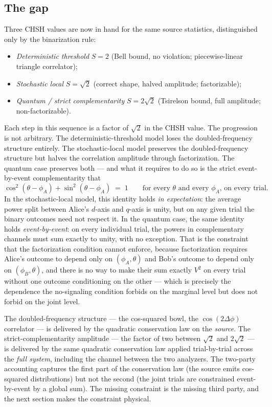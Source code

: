 \documentclass[
  11pt]{article}
\providecommand{\tightlist}{%
  \setlength{\itemsep}{0pt}\setlength{\parskip}{0pt}}
\begin{document}
\subsection{The gap}\label{the-gap}

Three CHSH values are now in hand for the same source statistics,
distinguished only by the binarization rule:

\begin{itemize}
\tightlist
\item
  \emph{Deterministic threshold} \(S = 2\) (Bell bound, no violation;
  piecewise-linear triangle correlator);
\item
  \emph{Stochastic local} \(S = \sqrt{2}\) (correct shape, halved
  amplitude; factorizable);
\item
  \emph{Quantum / strict complementarity} \(S = 2\sqrt{2}\) (Tsirelson
  bound, full amplitude; non-factorizable).
\end{itemize}

Each step in this sequence is a factor of \(\sqrt{2}\) in the CHSH
value. The progression is not arbitrary. The deterministic-threshold
model loses the doubled-frequency structure entirely. The
stochastic-local model preserves the doubled-frequency structure but
halves the correlation amplitude through factorization. The quantum case
preserves both --- and what it requires to do so is the strict
event-by-event complementarity that \[
\cos^2(\theta - \phi_A) + \sin^2(\theta - \phi_A) \;=\; 1 \qquad \text{for every $\theta$ and every $\phi_A$, on every trial.}
\] In the stochastic-local model, this identity holds \emph{in
expectation}: the average power split between Alice's \(d\)-axis and
\(q\)-axis is unity, but on any given trial the binary outcomes need not
respect it. In the quantum case, the same identity holds
\emph{event-by-event}: on every individual trial, the powers in
complementary channels must sum exactly to unity, with no exception.
That is the constraint that the factorization condition cannot enforce,
because factorization requires Alice's outcome to depend only on
\((\phi_A, \theta)\) and Bob's outcome to depend only on
\((\phi_B, \theta)\), and there is no way to make their sum exactly
\(V^2\) on every trial without one outcome conditioning on the other ---
which is precisely the dependence the no-signaling condition forbids on
the marginal level but does not forbid on the joint level.

The doubled-frequency structure --- the cos-squared bowl, the
\(\cos(2\Delta\phi)\) correlator --- is delivered by the quadratic
conservation law on the \emph{source}. The strict-complementarity
amplitude --- the factor of two between \(\sqrt{2}\) and \(2\sqrt{2}\)
--- is delivered by the same quadratic conservation law applied
trial-by-trial across the \emph{full system}, including the channel
between the two analyzers. The two-party accounting captures the first
part of the conservation law (the source emits cos-squared
distributions) but not the second (the joint trials are constrained
event-by-event by a global sum). The missing constraint is the missing
third party, and the next section makes the constraint physical.
\end{document}

